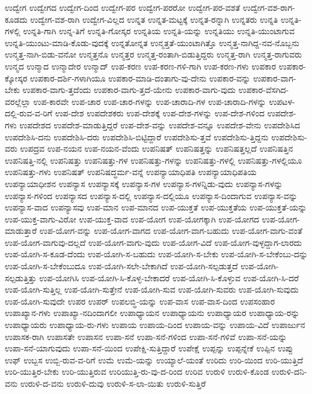 {ಉದ್ವೇಗ
ಉದ್ವೇಗದ
ಉದ್ವೇಗ-ದಿಂದ
ಉದ್ವೇಗ-ಪರ
ಉದ್ವೇಗ-ಪರರೋ
ಉದ್ವೇಗ-ಪರ-ವಶತೆ
ಉದ್ವೇಗ-ವಶ-ರಾಗ-ಕೂಡದು
ಉದ್ವೇಗ-ವಶ-ರಾಗಿ
ಉದ್ವೇಗ-ವಿಲ್ಲದ
ಉನ್ನತ
ಉನ್ನತ-ಮಟ್ಟಕ್ಕೆ
ಉನ್ನತ-ರನ್ನಾಗಿ
ಉನ್ನತರು
ಉನ್ನತಿ
ಉನ್ನತಿ-ಗಳಲ್ಲಿ
ಉನ್ನತಿ-ಗಾಗಿ
ಉನ್ನ-ತಿಗೆ
ಉನ್ನತಿ-ಗೋಸ್ಕರ
ಉನ್ನತಿಯ
ಉನ್ನತಿ-ಯನ್ನು
ಉನ್ನತಿಯು
ಉನ್ನತಿ-ಯುಂಟಾಗುವ
ಉನ್ನತಿ-ಯುಂಟು-ಮಾಡಿ-ಕೊಡು-ವುದಕ್ಕೆ
ಉನ್ನತೋನ್ನತ
ಉನ್ಮತ್ತತೆ-ಯುಂಟಾಗಿತ್ತೊ
ಉನ್ಮತ್ತ-ನಾಗಿದ್ದ-ನವ-ನೊಬ್ಬನು
ಉನ್ಮತ್ತ-ನಾಗಿ-ಬಿಡು-ವನೋ
ಉನ್ಮತ್ತನೊ
ಉನ್ಮತ್ತರ
ಉನ್ಮತ್ತ-ರಂತಾಗಿ-ಬಿಡುತ್ತಿದ್ದರು
ಉನ್ಮತ್ತ-ರಾಗಿ
ಉನ್ಮತ್ತ-ರಾಗುವರು
ಉನ್ಮದ
ಉನ್ಮಾದ
ಉನ್ಮಾದೇರ
ಉನ್ಮಾದ್
ಉಪ-ಕರಣ
ಉಪ-ಕರಣ-ಗಳಿ-ಗಾಗಿ
ಉಪ-ಕರಣ-ಗಳು
ಉಪಕಾರ
ಉಪಕಾರ-ಕ್ಕೋಸ್ಕರ
ಉಪಕಾರ-ದರ್ಶಿ-ಗಳಾಗಿಯೂ
ಉಪಕಾರ-ಮಾಡಿ-ದಂತಾಗು-ವು-ದೇನು
ಉಪಕಾರ-ವನ್ನು
ಉಪಕಾರ-ವಾಗ-ಬೇಕು
ಉಪಕಾರ-ವಾಗು-ತ್ತದೆಂದು
ಉಪಕಾರ-ವಾಗು-ತ್ತದೆ-ಯೇನು
ಉಪಕಾರ-ವಾಗು-ವುದು
ಉಪಕಾರ-ವೆಸಗಿದ-ವರಲ್ಲೆಲ್ಲಾ
ಉಪ-ಕಾರವೇ
ಉಪ-ಚಾರ
ಉಪ-ಚಾರ-ಗಳನ್ನು
ಉಪ-ಚಾರಾದಿ-ಗಳ
ಉಪ-ಚಾರಾದಿ-ಗಳನ್ನು
ಉಪಟಳ-ದಲ್ಲಿ-ರುವ-ವ-ರಿಗೆ
ಉಪ-ದೇಶ
ಉಪದೇಶಕರು
ಉಪ-ದೇಶಕ್ಕೆ
ಉಪ-ದೇಶ-ಗಳನ್ನು
ಉಪ-ದೇಶ-ಗಳಿಂದ
ಉಪದೇಶ-ಗಳು
ಉಪದೇಶದ
ಉಪದೇಶ-ಮಾಡುತ್ತಿದ್ದರೆ
ಉಪ-ದೇಶ-ವನ್ನು
ಉಪದೇಶ-ವನ್ನೂ
ಉಪದೇಶ-ವೇನು
ಉಪದೇಶಿಸಿದ
ಉಪದೇಶಿಸಿ-ದನು
ಉಪದೇಶಿಸಿ-ದರು
ಉಪದೇಶಿಸಿ-ಬಿಟ್ಟಿದ್ದಾರೆ
ಉಪದೇಶಿಸು-ತ್ತವೆ
ಉಪದೇಶಿಸು-ತ್ತಿದ್ದನು
ಉಪದೇಶಿಸು-ವರು
ಉಪದ್ರವ
ಉಪ-ನಯನ
ಉಪ-ನಯನ-ವೆಂದು
ಉಪನಿಷತ್
ಉಪನಿಷತ್ತನ್ನು
ಉಪನಿಷತ್ತಲ್ಲದೆ
ಉಪನಿಷತ್ತಿನ
ಉಪನಿಷತ್ತಿ-ನಲ್ಲಿ
ಉಪನಿಷತ್ತು
ಉಪನಿಷತ್ತು-ಗಳ
ಉಪನಿಷತ್ತು-ಗಳನ್ನು
ಉಪನಿಷತ್ತು-ಗಳಲ್ಲಿ
ಉಪನಿಷತ್ತು-ಗಳಲ್ಲಿಯೂ
ಉಪನಿಷತ್ತು-ಗಳು
ಉಪನಿಷತ್
ಉಪನಿಷದ್ಧರ್ಮ-ವನ್ನೆ
ಉಪನ್ಯಾಯಾಧಿಪತಿ
ಉಪನ್ಯಾಯಾಧಿಪತಿಯ
ಉಪನ್ಯಾಯಾಧೀಶನ
ಉಪನ್ಯಾಸ
ಉಪನ್ಯಾಸಕ್ಕೆ
ಉಪನ್ಯಾಸ-ಗಳ
ಉಪನ್ಯಾಸ-ಗಳನ್ನಿಡು-ವುದು
ಉಪನ್ಯಾಸ-ಗಳನ್ನು
ಉಪನ್ಯಾಸ-ಗಳಿಂದ
ಉಪನ್ಯಾಸದ
ಉಪನ್ಯಾಸ-ದಲ್ಲಿ
ಉಪನ್ಯಾಸ-ದಲ್ಲಿಯೂ
ಉಪನ್ಯಾಸ-ದಿಂದಾಗುವ
ಉಪನ್ಯಾಸ-ವನ್ನು
ಉಪನ್ಯಾಸ-ವಾದ
ಉಪನ್ಯಾಸವು
ಉಪ-ಮಾನ
ಉಪ-ಮಾನದ
ಉಪ-ಯುಕ್ತತೆ
ಉಪ-ಯುಕ್ತತೆಯ
ಉಪ-ಯುಕ್ತತೆ-ಯನ್ನು
ಉಪ-ಯುಕ್ತ-ವಾಗು-ವಿರೋ
ಉಪ-ಯುಕ್ತ-ವಾದ
ಉಪ-ಯೋಗ
ಉಪ-ಯೋಗಕ್ಕಾಗಿ
ಉಪ-ಯೋಗದ
ಉಪ-ಯೋಗ-ಮಾಡುತ್ತಾರೆ
ಉಪ-ಯೋಗ-ವನ್ನು
ಉಪ-ಯೋಗ-ವಾಗದ
ಉಪ-ಯೋಗ-ವಾಗ-ಬಹುದು
ಉಪ-ಯೋಗ-ವಾಗು-ವಂತೆ
ಉಪ-ಯೋಗ-ವಾಗುವು-ದಲ್ಲದೆ
ಉಪ-ಯೋಗ-ವಾಗು-ವುದು
ಉಪ-ಯೋಗ-ವಿದೆ
ಉಪ-ಯೋಗ-ವುಳ್ಳದ್ದಾಗ-ಲಾರದು
ಉಪ-ಯೋಗಿ-ಸ-ಕೂಡ-ದೆಂದು
ಉಪ-ಯೋಗಿ-ಸ-ಬಹುದು
ಉಪ-ಯೋಗಿ-ಸ-ಬೇಕು
ಉಪ-ಯೋಗಿ-ಸ-ಬೇಕೆಂಬು-ದನ್ನು
ಉಪ-ಯೋಗಿ-ಸ-ಬೇಕೆಂಬುದೂ
ಉಪ-ಯೋಗಿ-ಸಲೇ-ಬೇಕಾಗಿದೆ
ಉಪ-ಯೋಗಿ-ಸಲ್ಪಡುತ್ತದೆ
ಉಪ-ಯೋಗಿ-ಸಲ್ಪಡುತ್ತಿತ್ತು
ಉಪ-ಯೋಗಿಸಿ
ಉಪ-ಯೋಗಿ-ಸಿ-ಕೊಳ್ಳ-ಬೇಕಾದರೆ
ಉಪ-ಯೋಗಿ-ಸಿ-ಕೊಳ್ಳುವ
ಉಪ-ಯೋಗಿ-ಸಿ-ದರೆ
ಉಪ-ಯೋಗಿ-ಸುತ್ತಿಲ್ಲ
ಉಪ-ಯೋಗಿ-ಸುತ್ತೇನೆ
ಉಪ-ಯೋಗಿ-ಸುವ
ಉಪ-ಯೋಗಿ-ಸುವರು
ಉಪ-ಯೋಗಿ-ಸುವುದು
ಉಪ-ಯೋಗಿ-ಸುವುದೇ
ಉಪರ
ಉಪರ್
ಉಪಲಬ್ಧಿ-ಯನ್ನು
ಉಪ-ವಾಸ
ಉಪ-ವಾಸ-ದಿಂದ
ಉಪಸಂಹಾರ
ಉಪಾಖ್ಯಾನ-ಗಳು
ಉಪಾಖ್ಯಾ-ನದಿಂದಾಗಲೀ
ಉಪಾಧ್ಯಾಯನ
ಉಪಾಧ್ಯಾಯನು
ಉಪಾಧ್ಯಾಯರ
ಉಪಾಧ್ಯಾಯ-ರನ್ನು
ಉಪಾಧ್ಯಾಯರು
ಉಪಾಧ್ಯಾಯ-ರು-ಗಳು
ಉಪಾಯ
ಉಪಾಯ-ದಿಂದ
ಉಪಾಯ-ವನ್ನು
ಉಪಾಯ-ವಿದೆ
ಉಪಾರ್ಜುನ
ಉಪಾಸಕ-ರಾಗಿ
ಉಪಾಸತೇ
ಉಪಾಸನ
ಉಪಾ-ಸನೆ
ಉಪಾ-ಸನೆ-ಗಳಿಂದ
ಉಪಾ-ಸನೆ-ಗಳಿವೆ
ಉಪಾ-ಸನೆ-ಯನ್ನು
ಉಪಾ-ಸನೆ-ಯಾಗುವುದು
ಉಪಾ-ಸನೆ-ಯಿಂದ
ಉಪೇಕ್ಷಿ-ಸುತ್ತಿದ್ದಾರೆ
ಉಪೇಕ್ಷೆ
ಉಪ್ಪನ್ನು
ಉಪ್ಪನ್ನೇಕೆ
ಉಪ್ಪಿನ
ಉಪ್ಪು
ಉಫ್
ಉಬ್ಬಸ
ಉಬ್ಬಿ-ರುವ-ವ-ರಿಗೆ
ಉಮೆ
ಉಮೆ-ಯನ್ನು
ಉಯ್ಯಾಲೆ-ಯಂತೆ
ಉರಿದು
ಉರಿ-ಯಿಂದ
ಉರಿ-ಯುತ್ತಿದೆ
ಉರಿ-ಯುತ್ತಿರ-ಬೇಕು
ಉರಿ-ಯುತ್ತಿರುವ
ಉರಿಯುತ್ತಿ-ರು-ವು-ದ-ರಿಂದ
ಉರಿವ
ಉರುಳಿ
ಉರುಳಿ-ಕೊಂಡ
ಉರುಳಿ-ದನಿ-ವನು
ಉರುಳಿ-ದ-ವನು
ಉರುಳಿ-ದುವು
ಉರುಳಿ-ಸ-ಲಾ-ಯಿತು
ಉರುಳಿ-ಸುತ್ತಿರೆ
}
